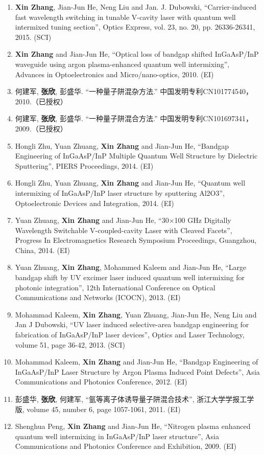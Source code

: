 \documentclass{ZJUthesis}
\begin{document}
\begin{publications}
\begin{enumerate}
\item{\textbf{Xin Zhang}, Jian-Jun He, Neng Liu and Jan. J. Dubowski, “Carrier-induced fast wavelength switching in tunable V-cavity laser with quantum well intermixed tuning section”, Optics Express, vol. 23, no. 20, pp. 26336-26341, 2015. (SCI)}
\item{\textbf{Xin Zhang} and Jian-Jun He, “Optical loss of bandgap shifted InGaAsP/InP waveguide using argon plasma-enhanced quantum well intermixing”, Advances in Optoelectronics and Micro/nano-optics, 2010. (EI)}
\item{何建军, \textbf{张欣}, 彭盛华. “一种量子阱混杂方法.” 中国发明专利CN101774540，2010.（已授权）}
\item{何建军, \textbf{张欣}, 彭盛华. “一种量子阱混合方法.” 中国发明专利CN101697341，2009.（已授权）}

\item{Hongli Zhu, Yuan Zhuang, \textbf{Xin Zhang} and Jian-Jun He, “Bandgap Engineering of InGaAsP/InP Multiple Quantum Well Structure by Dielectric Sputtering”, PIERS Proceedings, 2014. (EI)}
\item{Hongli Zhu, Yuan Zhuang, \textbf{Xin Zhang} and Jian-Jun He, “Quantum well intermixing of InGaAsP/InP laser structure by sputtering Al2O3”, Optoelectronic Devices and Integration, 2014. (EI)}
\item{Yuan Zhuang, \textbf{Xin Zhang} and Jian-Jun He, “30×100 GHz Digitally Wavelength Switchable V-coupled-cavity Laser with Cleaved Facets”, Progress In Electromagnetics Research Symposium Proceedings, Guangzhou, China, 2014. (EI)}
\item{Yuan Zhuang, \textbf{Xin Zhang}, Mohammed Kaleem and Jian-Jun He, “Large bandgap shift by UV excimer laser induced quantum well intermixing for photonic integration”, 12th International Conference on Optical Communications and Networks (ICOCN), 2013. (EI)}
\item{Mohammad Kaleem, \textbf{Xin Zhang}, Yuan Zhuang, Jian-Jun He, Neng Liu and Jan J Dubowski, “UV laser induced selective-area bandgap engineering for fabrication of InGaAsP/InP laser devices”, Optics and Laser Technology, volume 51, page 36-42, 2013. (SCI)}
\item{Mohammad Kaleem, \textbf{Xin Zhang} and Jian-Jun He, “Bandgap Engineering of InGaAsP/InP Laser Structure by Argon Plasma Induced Point Defects”, Asia Communications and Photonics Conference, 2012. (EI)}
\item{彭盛华, \textbf{张欣}, 何建军, “氩等离子体诱导量子阱混合技术”, 浙江大学学报工学版, volume 45, number 6, page 1057-1061, 2011. (EI)}
\item{Shenghua Peng, \textbf{Xin Zhang} and Jian-Jun He, “Nitrogen plasma enhanced quantum well intermixing in InGaAsP/InP laser structure”, Asia Communications and Photonics Conference and Exhibition, 2009. (EI)}

\end{enumerate}
\end{publications}
\end{document}
